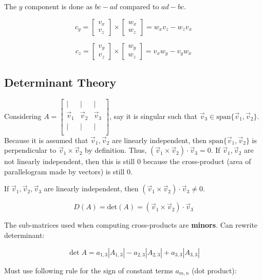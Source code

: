 The $y$ component is done as $bc-ad$ compared to $ad-bc$.

\[c_y=\begin{bmatrix}v_x\\ v_z\end{bmatrix}\times \begin{bmatrix}w_x\\ w_z\end{bmatrix}=w_xv_z-w_zv_x\]

\[c_z=\begin{bmatrix}v_y\\ v_z\end{bmatrix}\times \begin{bmatrix}w_y\\ w_z\end{bmatrix}=v_xw_y-v_yw_x\]

\subsection{Determinant Theory}

Considering $A=\begin{bmatrix}|&|&| \\\vec v_1 & \vec v_2 &\vec v_3 \\ |&|&| \\ \end{bmatrix}$,
say it is singular such that $\vec{v}_3\in \mathrm{span}\{\vec{v}_1,\vec{v}_2\}$. Because it is assumed that
$\vec{v}_1,\vec{v}_2$ are linearly independent, then $\mathrm{span}\{\vec{v}_1,\vec{v}_2\}$ is perpendicular to 
$\vec{v}_1\times \vec{v}_2$ by definition. Thus, $\boxed{(\vec{v}_1\times\vec{v}_2)\cdot \vec{v}_3=0}$.
If $\vec{v}_1,\vec{v}_2$ are not linearly independent, then this is still 0 because the cross-product (area of parallelogram made by vectors)
is still 0.

\noindent
If $\vec{v}_1,\vec{v}_2,\vec{v}_3$ are linearly independent, then $(\vec{v}_1\times\vec{v}_2)\cdot \vec{v}_3\neq0$.

\[\boxed{D(A)=\mathrm{det}(A)=(\vec{v}_1\times\vec{v}_2)\cdot \vec{v}_3}\]

\noindent
The sub-matrices used when computing cross-products are \textbf{minors}.
Can rewrite determinant:

\[\boxed{\det A= a_{1,3}\left|A_{1,3}\right|-a_{2,3}\left|A_{2,3}\right|+a_{3,3}\left|A_{3,3}\right|}\]

Must use following rule for the sign of constant terms $a_{m,n}$ (dot product):

